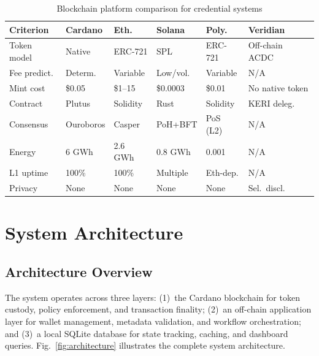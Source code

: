\documentclass[conference,10pt]{IEEEtran}
\begin{document}
\begin{table}[t]
\centering
\caption{Blockchain platform comparison for credential systems}
\label{tab:platforms}
\scriptsize
\begin{tabular}{@{}L{1.4cm}C{0.9cm}C{0.7cm}C{0.8cm}C{0.7cm}C{0.9cm}@{}}
\toprule
\textbf{Criterion} & \textbf{Cardano} & \textbf{Eth.} & \textbf{Solana} & \textbf{Poly.} & \textbf{Veridian} \\
\midrule
Token model & Native & ERC-721 & SPL & ERC-721 & Off-chain ACDC \\
Fee predict. & Determ. & Variable & Low/vol. & Variable & N/A \\
Mint cost & \$0.05 & \$1--15 & \$0.0003 & \$0.01 & No native token \\
Contract & Plutus & Solidity & Rust & Solidity & KERI deleg. \\
Consensus & Ouroboros & Casper & PoH+BFT & PoS (L2) & N/A \\
Energy & 6 GWh & 2.6 GWh & 0.8 GWh & 0.001 & N/A \\
L1 uptime & 100\% & 100\% & Multiple & Eth-dep. & N/A \\
Privacy & None & None & None & None & Sel.\ discl. \\
\bottomrule
\end{tabular}
\end{table}

\section{System Architecture}
\label{sec:architecture}

\subsection{Architecture Overview}

The system operates across three layers: (1)~the Cardano blockchain for token custody, policy enforcement, and transaction finality; (2)~an off-chain application layer for wallet management, metadata validation, and workflow orchestration; and (3)~a local SQLite database for state tracking, caching, and dashboard queries. Fig.~\ref{fig:architecture} illustrates the complete system architecture.
\end{document}
